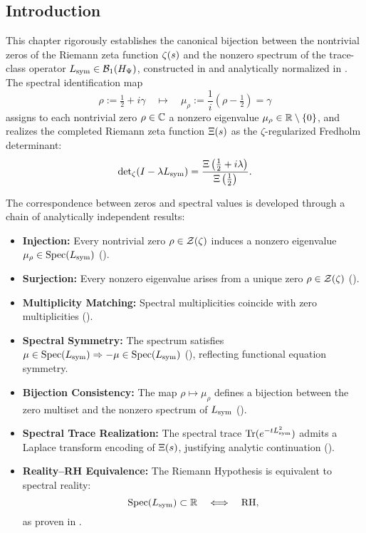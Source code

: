 \subsection*{Introduction}
\label{sec:intro_spectral_correspondence}

This chapter rigorously establishes the canonical bijection between the nontrivial zeros of the Riemann zeta function \( \zeta(s) \) and the nonzero spectrum of the trace-class operator \( L_{\mathrm{sym}} \in \mathcal{B}_1(H_{\Psi}) \), constructed in  and analytically normalized in . The spectral identification map
\[
\rho := \tfrac{1}{2} + i\gamma \quad \longmapsto \quad \mu_\rho := \frac{1}{i}(\rho - \tfrac{1}{2}) = \gamma
\]
assigns to each nontrivial zero \( \rho \in \mathbb{C} \) a nonzero eigenvalue \( \mu_\rho \in \mathbb{R} \setminus \{0\} \), and realizes the completed Riemann zeta function \( \Xi(s) \) as the \(\zeta\)-regularized Fredholm determinant:
\[
\det\nolimits_{\zeta}(I - \lambda L_{\mathrm{sym}}) = \frac{\Xi\left( \tfrac{1}{2} + i\lambda \right)}{\Xi\left( \tfrac{1}{2} \right)}.
\]

\medskip

The correspondence between zeros and spectral values is developed through a chain of analytically independent results:

\begin{itemize}
  \item \textbf{Injection:} Every nontrivial zero \( \rho \in \mathcal{Z}(\zeta) \) induces a nonzero eigenvalue \( \mu_\rho \in \operatorname{Spec}(L_{\mathrm{sym}}) \) ().

  \item \textbf{Surjection:} Every nonzero eigenvalue arises from a unique zero \( \rho \in \mathcal{Z}(\zeta) \) ().

  \item \textbf{Multiplicity Matching:} Spectral multiplicities coincide with zero multiplicities ().

  \item \textbf{Spectral Symmetry:} The spectrum satisfies \( \mu \in \operatorname{Spec}(L_{\mathrm{sym}}) \Rightarrow -\mu \in \operatorname{Spec}(L_{\mathrm{sym}}) \) (), reflecting functional equation symmetry.

  \item \textbf{Bijection Consistency:} The map \( \rho \mapsto \mu_\rho \) defines a bijection between the zero multiset and the nonzero spectrum of \( L_{\mathrm{sym}} \) ().

  \item \textbf{Spectral Trace Realization:} The spectral trace \( \operatorname{Tr}(e^{-t L_{\mathrm{sym}}^2}) \) admits a Laplace transform encoding of \( \Xi(s) \), justifying analytic continuation ().

  \item \textbf{Reality–RH Equivalence:} The Riemann Hypothesis is equivalent to spectral reality:
  \[
  \operatorname{Spec}(L_{\mathrm{sym}}) \subset \mathbb{R} \quad \Longleftrightarrow \quad \text{RH},
  \]
  as proven in .
\end{itemize}

